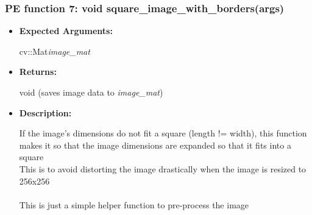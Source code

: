 \documentclass{scrreprt}
\begin{document}
\subsubsection{PE function 7: void square\_image\_with\_borders(args)}
\begin{itemize}
    \item \textbf{Expected Arguments:}

    cv::Mat\quad\textit{image\_mat}

    \item \textbf{Returns:}

    void (saves image data to \textit{image\_mat})

    \item \textbf{Description:}

    If the image's dimensions do not fit a square (length != width), this function makes it so that the image dimensions are expanded so that it fits into a square
    \\
    This is to avoid distorting the image drastically when the image is resized to 256x256
    \\\\
    This is just a simple helper function to pre-process the image
\end{itemize}
\end{document}
